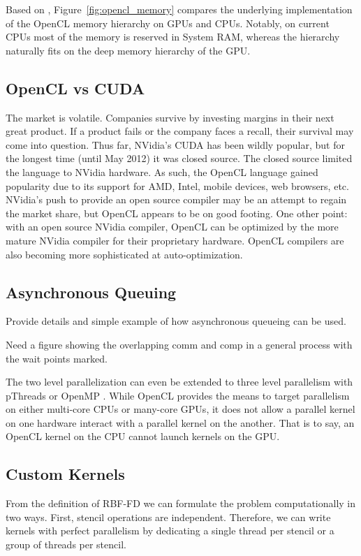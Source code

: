 \documentclass{report}
\begin{document}
Based on \cite{Behr:2009, OpenCL:2009}, Figure~\ref{fig:opencl_memory} compares the underlying implementation of the OpenCL memory hierarchy on GPUs and CPUs. Notably, on current CPUs most of the memory is reserved in System RAM, whereas the hierarchy naturally fits on the deep memory hierarchy of the GPU. 



\subsection{OpenCL vs CUDA}
The market is volatile. Companies survive by investing margins in their next great product. If a product fails or the company faces a recall, their survival may come into question. Thus far, NVidia's CUDA has been wildly popular, but for the longest time (until May 2012) it was closed source. The closed source limited the language to NVidia hardware. As such, the OpenCL language gained popularity due to its support for AMD, Intel, mobile devices, web browsers, etc. NVidia's push to provide an open source compiler may be an attempt to regain the market share, but OpenCL appears to be on good footing. One other point: with an open source NVidia compiler, OpenCL can be optimized by the more mature NVidia compiler for their proprietary hardware. OpenCL compilers are also becoming more sophisticated at auto-optimization. 

\subsection{Asynchronous Queuing} 
Provide details and simple example of how asynchronous queueing can be used. 

Need a figure showing the overlapping comm and comp in a general process with the wait points marked. 

The two level parallelization can even be extended to three level parallelism
with pThreads or OpenMP \cite{NVidia_multi-gpu_example}. While OpenCL provides
the means to target parallelism on either multi-core CPUs or many-core GPUs, it
does not allow a parallel kernel on one hardware interact with a parallel kernel
on the another. That is to say, an OpenCL kernel on the CPU cannot launch
kernels on the GPU.  


\subsection{Custom Kernels}

From the definition of RBF-FD we can formulate the problem computationally in two ways. First, stencil operations are independent. Therefore, we can write kernels with perfect parallelism by dedicating a single thread per stencil or a group of threads per stencil.  
\end{document}
